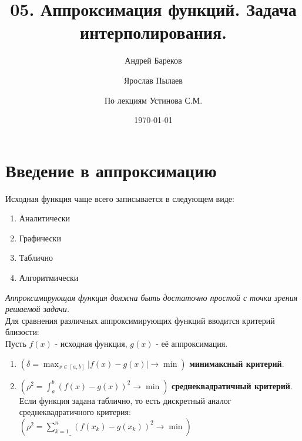 \documentclass[a4paper,11pt]{article}
\title{05. Аппроксимация функций. Задача интерполирования.}
\author{Андрей Бареков \and Ярослав Пылаев \and По лекциям Устинова С.М.}
\date{\today}
\begin{document}
\maketitle
\newpage

\section{Введение в аппроксимацию}
Исходная функция чаще всего записывается в следующем виде:
\begin{enumerate}
  \item Аналитически
  \item Графически
  \item Таблично
  \item Алгоритмически
\end{enumerate}
\textit{Аппроксимирующая функция должна быть достаточно простой с точки зрения решаемой задачи.} \\
\newline
Для сравнения различных аппроксимирующих функций вводится критерий близости: \\
Пусть $f(x)$ - исходная функция, $g(x)$ - её аппроксимация.
\begin{enumerate}
  \item $\boxed{(\delta = \max_{x \in [a,b]} |f(x) - g(x)| \to \min)}$ \textbf{минимаксный критерий}.
  \item
    $\boxed{(\rho^2 = \int_{a}^{b} (f(x) - g(x))^2 \to \min)}$ \textbf{среднеквадратичный критерий}. \\
    Если функция задана таблично, то есть дискретный аналог среднеквадратичного критерия: \large{$(\rho^2 = \underline{\sum_{k=1}^{n}} (f(x_k) - g(x_k))^2 \to \min)$}

\end{enumerate}
\end{document}
